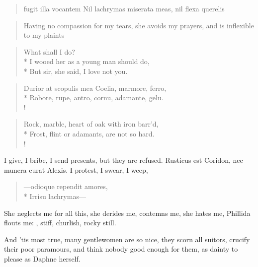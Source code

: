 \begin{latin}
\begin{verse}
fugit illa vocantem
Nil lachrymas miserata meas, nil flexa querelis
\end{verse}
\end{latin}
\translationrule%
\begin{verse}%
Having no compassion for my tears,
she avoids my prayers, and is inflexible to my plaints
\end{verse}%

\begin{verse}
What shall I do?\\*
I wooed her as a young man should do,\\*
But sir, she said, I love not you.
\end{verse}

\begin{latin}
\begin{verse}%
Durior at scopulis mea Coelia, marmore, ferro,\\*
Robore, rupe, antro, cornu, adamante, gelu.\\!
\end{verse}%
\end{latin}
\translationrule%
\begin{verse}%
Rock, marble, heart of oak with iron barr'd,\\*
Frost, flint or adamants, are not so hard.\\!
\end{verse}%
%

I give, I bribe, I send presents, but they are refused. Rusticus
est Coridon, nec munera curat Alexis. I protest, I swear, I weep,
%
\begin{latin}
\begin{verse}%
---odioque rependit amores,\\*
Irrisu lachrymas---
\end{verse}%
\end{latin}
%

She neglects me for all this, she derides me, contemns me, she hates
me, Phillida flouts me: , stiff,
churlish, rocky still.

And 'tis most true, many gentlewomen are so nice, they scorn all
suitors, crucify their poor paramours, and think nobody good enough for
them, as dainty to please as Daphne herself.

